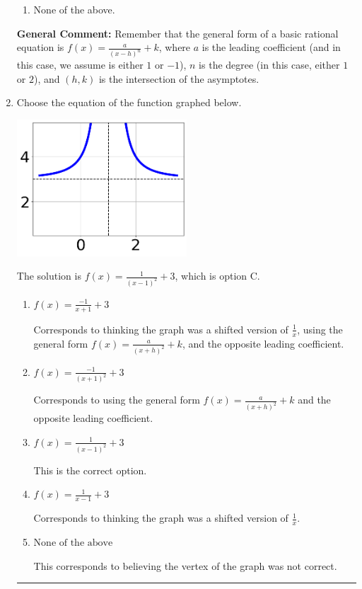 \documentclass{extbook}[14pt]
\newcommand{\litem}[1]{\item #1

\rule{\textwidth}{0.4pt}}
\begin{document}
\begin{enumerate}
{\begin{enumerate}[label=\Alph*.]
\begin{multicols}{2}
\end{multicols}\item None of the above.\end{enumerate}
\textbf{General Comment:} Remember that the general form of a basic rational equation is $ f(x) = \frac{a}{(x-h)^n} + k$, where $a$ is the leading coefficient (and in this case, we assume is either $1$ or $-1$), $n$ is the degree (in this case, either $1$ or $2$), and $(h, k)$ is the intersection of the asymptotes.
}
\litem{
Choose the equation of the function graphed below.

\begin{center}
    \includegraphics[width=0.5\textwidth]{../Figures/rationalGraphToEquationA.png}
\end{center}


The solution is \( f(x) = \frac{1}{(x - 1)^2} + 3 \), which is option C.\begin{enumerate}[label=\Alph*.]
\item \( f(x) = \frac{-1}{x + 1} + 3 \)

Corresponds to thinking the graph was a shifted version of $\frac{1}{x}$, using the general form $f(x) = \frac{a}{(x+h)^2}+k$, and the opposite leading coefficient.
\item \( f(x) = \frac{-1}{(x + 1)^2} + 3 \)

Corresponds to using the general form $f(x) = \frac{a}{(x+h)^2}+k$ and the opposite leading coefficient.
\item \( f(x) = \frac{1}{(x - 1)^2} + 3 \)

This is the correct option.
\item \( f(x) = \frac{1}{x - 1} + 3 \)

Corresponds to thinking the graph was a shifted version of $\frac{1}{x}$.
\item \( \text{None of the above} \)

This corresponds to believing the vertex of the graph was not correct.
\end{enumerate}

}
\end{enumerate}
\end{document}
